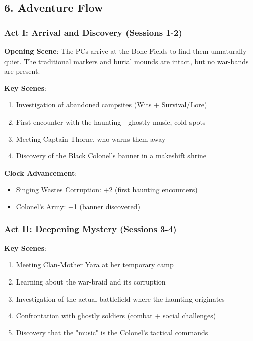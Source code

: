 \documentclass[11pt]{article}
\begin{document}
\subsection*{6. Adventure Flow}

\subsubsection*{Act I: Arrival and Discovery (Sessions 1-2)}

\textbf{Opening Scene}: The PCs arrive at the Bone Fields to find them unnaturally quiet. The traditional markers and burial mounds are intact, but no war-bands are present.

\textbf{Key Scenes}:
\begin{enumerate}[leftmargin=*]
\item Investigation of abandoned campsites (Wits + Survival/Lore)
\item First encounter with the haunting - ghostly music, cold spots
\item Meeting Captain Thorne, who warns them away
\item Discovery of the Black Colonel's banner in a makeshift shrine
\end{enumerate}

\textbf{Clock Advancement}: 
\begin{itemize}[leftmargin=*]
\item Singing Wastes Corruption: +2 (first haunting encounters)
\item Colonel's Army: +1 (banner discovered)
\end{itemize}

\subsubsection*{Act II: Deepening Mystery (Sessions 3-4)}

\textbf{Key Scenes}:
\begin{enumerate}[leftmargin=*]
\item Meeting Clan-Mother Yara at her temporary camp
\item Learning about the war-braid and its corruption
\item Investigation of the actual battlefield where the haunting originates
\item Confrontation with ghostly soldiers (combat + social challenges)
\item Discovery that the "music" is the Colonel's tactical commands
\end{enumerate}
\end{document}
